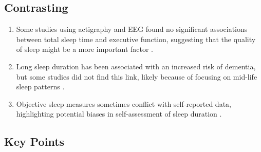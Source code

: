 \begin{centering}\subsection{Contrasting}\end{centering}

\begin{enumerate}
    \item Some studies using actigraphy and EEG found no significant associations between total sleep time and executive function, suggesting that the quality of sleep might be a more important factor \parencite[page 805, para. 4]{2}.

    \item Long sleep duration has been associated with an increased risk of dementia, but some studies did not find this link, likely because of focusing on mid-life sleep patterns \parencite[page 805, para. 2]{2}.

    \item Objective sleep measures sometimes conflict with self-reported data, highlighting potential biases in self-assessment of sleep duration \parencite[page 806, para. 1]{2}.

\end{enumerate}

\begin{centering}\subsection{Key Points}\end{centering}

